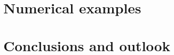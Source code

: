 \documentclass[10pt,a4paper]{article}
\renewcommand{\ta}[1]{\mathbfit{#1}}
\renewcommand{\ts}[1]{\mathbfit{#1}}
\renewcommand{\tf}[1]{\mathbfsfup{#1}}
\renewcommand{\Box}{\mdlgwhtsquare}
\newcommand{\ded}{\mathrm{d}}
\newcommand{\dep}{\mathrm{p}}
\begin{document}


\section{Numerical examples}\label{sec:examples}

\section{Conclusions and outlook}\label{sec:conlusions}
\end{document}
